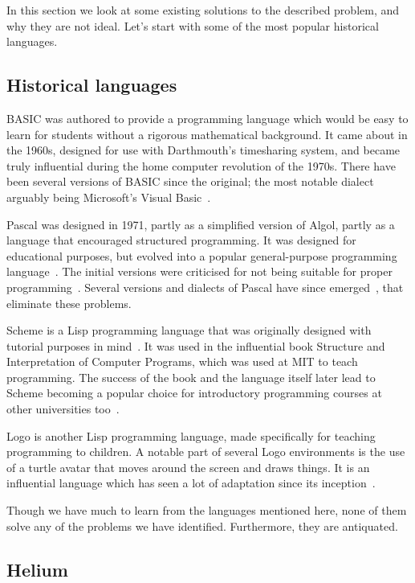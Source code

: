 In this section we look at some existing solutions to the described problem,
and why they are not ideal. Let's start with some of the most popular
historical languages.

\subsection{Historical languages}

BASIC was authored to provide a programming language which would be easy to
learn for students without a rigorous mathematical background. It came about in
the 1960s, designed for use with Darthmouth's timesharing system, and became
truly influential during the home computer revolution of the 1970s. There have
been several versions of BASIC since the original; the most notable dialect
arguably being Microsoft's Visual Basic~\cite{time2014basic}.

Pascal was designed in 1971, partly as a simplified version of Algol, partly as
a language that encouraged structured programming. It was designed for
educational purposes, but evolved into a popular general-purpose programming
language~\cite{cantu2008essential}. The initial versions were criticised for
not being suitable for proper programming~\cite{kernighan1981pascal}. Several
versions and dialects of Pascal have since emerged~\cite{cantu2008essential},
that eliminate these problems.

Scheme is a Lisp programming language that was originally designed with
tutorial purposes in mind~\cite{sussman1998scheme}. It was used in the
influential book Structure and Interpretation of Computer Programs, which was
used at MIT to teach programming. The success of the book and the language
itself later lead to Scheme becoming a popular choice for introductory
programming courses at other universities too~\cite{felleisen2004structure}.

Logo is another Lisp programming language, made specifically for teaching
programming to children. A notable part of several Logo environments is the use
of a turtle avatar that moves around the screen and draws things. It is an
influential language which has seen a lot of adaptation since its
inception~\cite{logo2011whatislogo}.

Though we have much to learn from the languages mentioned here, none of them
solve any of the problems we have identified. Furthermore, they are antiquated.

\subsection{Helium}

